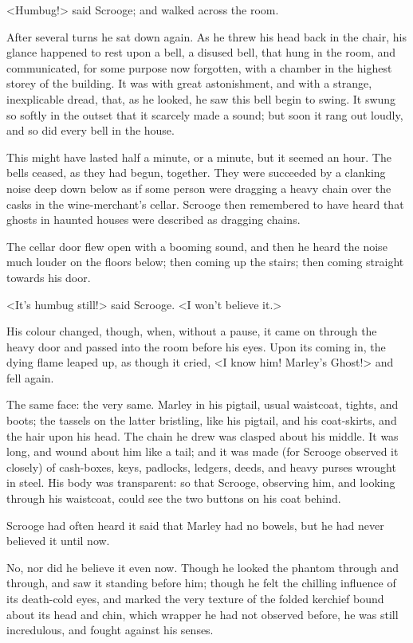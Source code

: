 <Humbug!> said Scrooge; and walked across the room.

After several turns he sat down again. As he threw his head back in the chair,
his glance happened to rest upon a bell, a disused bell, that hung in the room,
and communicated, for some purpose now forgotten, with a chamber in the highest
storey of the building. It was with great astonishment, and with a strange,
inexplicable dread, that, as he looked, he saw this bell begin to swing. It
swung so softly in the outset that it scarcely made a sound; but soon it rang
out loudly, and so did every bell in the house.

This might have lasted half a minute, or a minute, but it seemed an hour. The
bells ceased, as they had begun, together. They were succeeded by a clanking
noise deep down below as if some person were dragging a heavy chain over the
casks in the wine-merchant's cellar. Scrooge then remembered to have heard that
ghosts in haunted houses were described as dragging chains.

The cellar door flew open with a booming sound, and then he heard the noise much
louder on the floors below; then coming up the stairs; then coming straight
towards his door.

<It's humbug still!> said Scrooge. <I won't believe it.>

His colour changed, though, when, without a pause, it came on through the heavy
door and passed into the room before his eyes. Upon its coming in, the dying
flame leaped up, as though it cried, <I know him! Marley's Ghost!> and fell
again.

The same face: the very same. Marley in his pigtail, usual waistcoat, tights,
and boots; the tassels on the latter bristling, like his pigtail, and his
coat-skirts, and the hair upon his head. The chain he drew was clasped about his
middle. It was long, and wound about him like a tail; and it was made (for
Scrooge observed it closely) of cash-boxes, keys, padlocks, ledgers, deeds, and
heavy purses wrought in steel. His body was transparent: so that Scrooge,
observing him, and looking through his waistcoat, could see the two buttons on
his coat behind.

Scrooge had often heard it said that Marley had no bowels, but he had never
believed it until now.

No, nor did he believe it even now. Though he looked the phantom through and
through, and saw it standing before him; though he felt the chilling influence
of its death-cold eyes, and marked the very texture of the folded kerchief bound
about its head and chin, which wrapper he had not observed before, he was still
incredulous, and fought against his senses.


